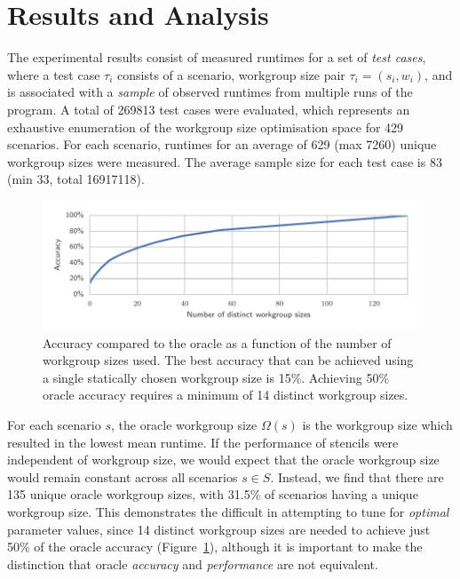 \documentclass[nonatbib,preprint,10pt]{sigplanconf}
\begin{document}
\section{Results and Analysis}

The experimental results consist of measured runtimes for a set of
\emph{test cases}, where a test case $\tau_i$ consists of a scenario,
workgroup size pair $\tau_i = (s_i,w_i)$, and is associated with a
\emph{sample} of observed runtimes from multiple runs of the
program. A total of 269813 test cases were evaluated, which represents
an exhaustive enumeration of the workgroup size optimisation space for
429 scenarios. For each scenario, runtimes for an average of 629 (max
7260) unique workgroup sizes were measured. The average sample size
for each test case is 83 (min 33, total 16917118).


\begin{figure}
\centering
\includegraphics[width=\columnwidth]{img/num_params_oracle.pdf}
\caption[Oracle accuracy vs.\ number of workgroup sizes]{%
  Accuracy compared to the oracle as a function of the number of
  workgroup sizes used. The best accuracy that can be achieved using a
  single statically chosen workgroup size is 15\%. Achieving 50\%
  oracle accuracy requires a minimum of 14 distinct workgroup sizes.%
}
\label{fig:oracle-accuracy}
\end{figure}

For each scenario $s$, the oracle workgroup size $\Omega(s)$ is the
workgroup size which resulted in the lowest mean runtime. If the
performance of stencils were independent of workgroup size, we would
expect that the oracle workgroup size would remain constant across all
scenarios $s \in S$. Instead, we find that there are 135 unique oracle
workgroup sizes, with 31.5\% of scenarios having a unique workgroup
size. This demonstrates the difficult in attempting to tune for
\emph{optimal} parameter values, since 14 distinct workgroup sizes are
needed to achieve just 50\% of the oracle accuracy
(Figure~\ref{fig:oracle-accuracy}), although it is important to make
the distinction that oracle \emph{accuracy} and \emph{performance} are
not equivalent.
\end{document}
